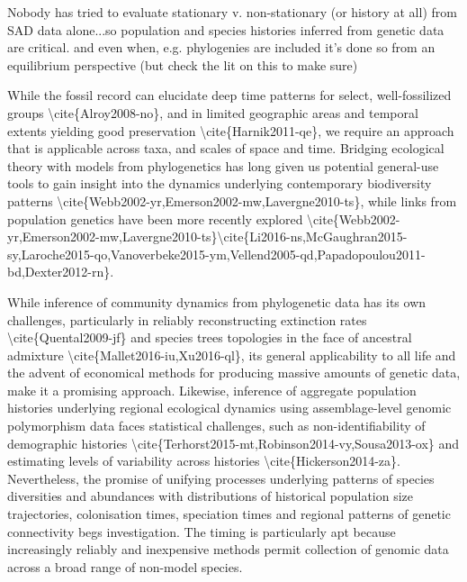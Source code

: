 \documentclass[]{article}
\begin{document}
Nobody has tried to evaluate stationary v. non-stationary (or history at
all) from SAD data alone...so population and species histories inferred
from genetic data are critical. and even when, e.g. phylogenies are
included it's done so from an equilibrium perspective (but check the lit
on this to make sure)

While the fossil record can elucidate deep time patterns for select,
well-fossilized groups \textbackslash{}cite\{Alroy2008-no\}, and in
limited geographic areas and temporal extents yielding good preservation
\textbackslash{}cite\{Harnik2011-qe\}, we require an approach that is
applicable across taxa, and scales of space and time. Bridging
ecological theory with models from phylogenetics has long given us
potential general-use tools to gain insight into the dynamics underlying
contemporary biodiversity patterns
\textbackslash{}cite\{Webb2002-yr,Emerson2002-mw,Lavergne2010-ts\},
while links from population genetics have been more recently explored
\textbackslash{}cite\{Webb2002-yr,Emerson2002-mw,Lavergne2010-ts\}\textbackslash{}cite\{Li2016-ns,McGaughran2015-sy,Laroche2015-qo,Vanoverbeke2015-ym,Vellend2005-qd,Papadopoulou2011-bd,Dexter2012-rn\}.

While inference of community dynamics from phylogenetic data has its own
challenges, particularly in reliably reconstructing extinction rates
\textbackslash{}cite\{Quental2009-jf\} and species trees topologies in
the face of ancestral admixture
\textbackslash{}cite\{Mallet2016-iu,Xu2016-ql\}, its general
applicability to all life and the advent of economical methods for
producing massive amounts of genetic data, make it a promising approach.
Likewise, inference of aggregate population histories underlying
regional ecological dynamics using assemblage-level genomic polymorphism
data faces statistical challenges, such as non-identifiability of
demographic histories
\textbackslash{}cite\{Terhorst2015-mt,Robinson2014-vy,Sousa2013-ox\} and
estimating levels of variability across histories
\textbackslash{}cite\{Hickerson2014-za\}. Nevertheless, the promise of
unifying processes underlying patterns of species diversities and
abundances with distributions of historical population size
trajectories, colonisation times, speciation times and regional patterns
of genetic connectivity begs investigation. The timing is particularly
apt because increasingly reliably and inexpensive methods permit
collection of genomic data across a broad range of non-model species.
\end{document}
